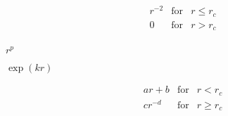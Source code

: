 \documentclass{article}
\begin{document}
\begin{eqnarray*}
r^{-2} & \mbox{for} & r \leq r_c \\
0 & \mbox{for} & r > r_c\\
\end{eqnarray*}
\pagebreak

$r^p$
\pagebreak

$\exp(k r)$
\pagebreak

\begin{eqnarray*}
ar + b & \mbox{for} & r < r_c \\
c r^{-d} & \mbox{for} & r \geq r_c\\
\end{eqnarray*}
\pagebreak
\end{document}
